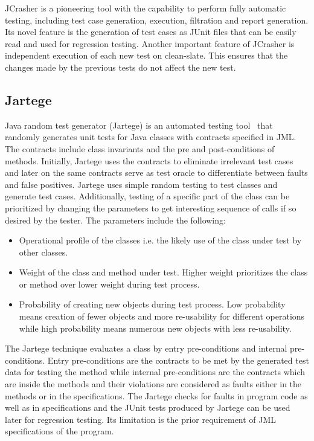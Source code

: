 JCrasher is a pioneering tool with the capability to perform fully automatic testing, including test case generation, execution, filtration and report generation. Its novel feature is the generation of test cases as JUnit files that can be easily read and used for regression testing. Another important feature of JCrasher is independent execution of each new test on clean-slate. This ensures that the changes made by the previous tests do not affect the new test.  



\subsection{Jartege} \label{jartege_2}
Java random test generator (Jartege) is an automated testing tool~\cite{oriat2005jartege} that randomly generates unit tests for Java classes with contracts specified in JML. The contracts include class invariants and the pre and post-conditions of methods. Initially, Jartege uses the contracts to eliminate irrelevant test cases and later on the same contracts serve as test oracle to differentiate between faults and false positives. Jartege uses simple random testing to test classes and generate test cases. Additionally, testing of a specific part of the class can be prioritized by changing the parameters to get interesting sequence of calls if so desired by the tester. The parameters include the following: 

\begin{itemize}
\item Operational profile of the classes i.e. the likely use of the class under test by other classes.  
\item Weight of the class and method under test. Higher weight prioritizes the class or method over lower weight during test process. 
\item Probability of creating new objects during test process. Low probability means creation of fewer objects and more re-usability for different operations while high probability means numerous new objects with less re-usability.
\end{itemize}

The Jartege technique evaluates a class by entry pre-conditions and internal pre-conditions. Entry pre-conditions are the contracts to be met by the generated test data for testing the method while internal pre-conditions are the contracts which are inside the methods and their violations are considered as faults either in the methods or in the specifications. The Jartege checks for faults in program code as well as in specifications and the JUnit tests produced by Jartege can be used later for regression testing. Its limitation is the prior requirement of JML specifications of the program.

